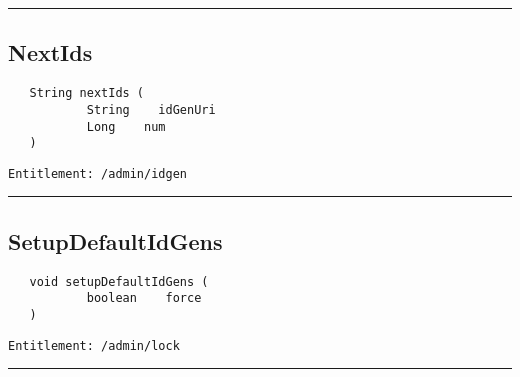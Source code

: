 \rule{12cm}{2pt}
\subsection{NextIds}
\label{Api:NextIds}
\begin{Verbatim}
   String nextIds (
           String    idGenUri
           Long    num
   )
\end{Verbatim}
\begin{Verbatim}[formatcom=\color{Maroon}]
  Entitlement: /admin/idgen
\end{Verbatim}



\rule{12cm}{2pt}
\subsection{SetupDefaultIdGens}
\label{Api:SetupDefaultIdGens}
\begin{Verbatim}
   void setupDefaultIdGens (
           boolean    force
   )
\end{Verbatim}
\begin{Verbatim}[formatcom=\color{Maroon}]
  Entitlement: /admin/lock
\end{Verbatim}



\rule{12cm}{2pt}
